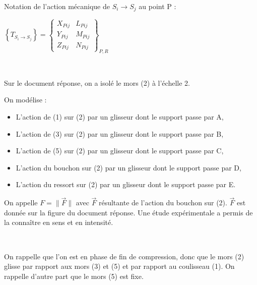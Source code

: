 Notation de l'action mécanique de $S_i \rightarrow S_j$ au point P :

\begin{center}
$\left\{T_{S_i \rightarrow S_j}\right\}=\left\{
\begin{array}{cc}X_{Pij} & L_{Pij}  \\
Y_{Pij} & M_{Pij}  \\
Z_{Pij} & N_{Pij}
\end{array}
\right\}_{P,R}$
\end{center}


~\

Sur le document réponse, on a isolé le mors (2) à l'échelle 2.

On modélise :
\begin{itemize}
 \item L'action de (1) sur (2) par un glisseur dont le support passe par A,
 \item L'action de (3) sur (2) par un glisseur dont le support passe par B,
 \item L'action de (5) sur (2) par un glisseur dont le support passe par C,
 \item L'action du bouchon sur (2) par un glisseur dont le support passe par D,
 \item L'action du ressort sur (2) par un glisseur dont le support passe par E.
\end{itemize}

On appelle $F=\|\overrightarrow{F}\|$ avec $\overrightarrow{F}$ résultante de l'action du bouchon sur (2). $\overrightarrow{F}$ est donnée sur la figure du document réponse. Une étude expérimentale a permis de la connaître en sens et en intensité.


~\

On rappelle que l'on est en phase de fin de compression, donc que le mors (2) glisse par rapport aux mors (3) et (5) et par rapport au coulisseau (1). On rappelle d'autre part que le mors (5) est fixe.

